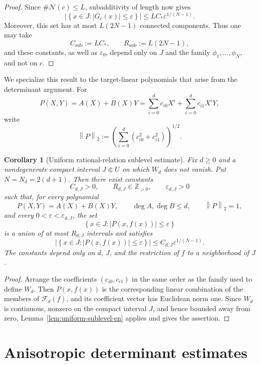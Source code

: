 \documentclass[11pt]{amsart}
\numberwithin{equation}{section}
\newtheorem{corollary}[corollary]{Corollary}
\theoremstyle{definition}
\theoremstyle{remark}
\newcommand{\Z}{\mathbb Z}
\newcommand{\norm}[1]{\left\lVert #1\right\rVert}
\newcommand{\abs}[1]{\left\lvert #1\right\rvert}
\newcommand{\set}[1]{\left\{#1\right\}}
\newcommand{\eps}{\varepsilon}
\begin{document}
\begin{proof}
Since $\#\mathcal N(c)\leq L$, subadditivity of length now gives
\[
\left|\set{x\in J:\abs{G_c(x)}\leq\eps}\right|
\leq
LC_*\eps^{1/(N-1)}.
\]
Moreover, this set has at most $L(2N-1)$ connected components.
Thus one may take
\[
C_{\mathrm{sub}}:=LC_*,
\qquad
R_{\mathrm{sub}}:=L(2N-1),
\]
and these constants, as well as $\eps_0$, depend only on $J$ and the
family $\phi_1,\ldots,\phi_N$, and not on $c$.
\end{proof}

We specialize this result to the target-linear polynomials that arise
from the determinant argument. For
\[
P(X,Y)=A(X)+B(X)Y
=\sum_{i=0}^d c_{i0}X^i+\sum_{i=0}^d c_{i1}X^iY,
\]
write
\[
\norm{P}_2
:=
\left(\sum_{i=0}^d(c_{i0}^2+c_{i1}^2)\right)^{1/2}.
\]

\begin{corollary}[Uniform rational-relation sublevel estimate]
\label{cor:polynomial-sublevel-en}
Fix $d\geq0$ and a nondegenerate compact interval $J\Subset U$ on which $W_d$ does
not vanish. Put $N=N_d=2(d+1)$. Then there exist constants
\[
C_{d,J}>0,
\qquad
R_{d,J}\in\Z_{>0},
\qquad
\eps_{d,J}>0
\]
such that, for every polynomial
\[
P(X,Y)=A(X)+B(X)Y,
\qquad
\deg A,\deg B\leq d,
\qquad
\norm{P}_2=1,
\]
and every $0<\eps<\eps_{d,J}$, the set
\[
\set{x\in J:\abs{P(x,f(x))}\leq\eps}
\]
is a union of at most $R_{d,J}$ intervals and satisfies
\begin{equation}\label{eq:poly-sublevel-en}
\left|\set{x\in J:\abs{P(x,f(x))}\leq\eps}\right|
\leq C_{d,J}\eps^{1/(N-1)}.
\end{equation}
The constants depend only on $d$, $J$, and the restriction of $f$ to a
neighborhood of $J$.
\end{corollary}

\begin{proof}
Arrange the coefficients $(c_{i0},c_{i1})$ in the same order as the
family used to define $W_d$. Then $P(x,f(x))$ is the corresponding
linear combination of the members of $\mathcal F_d(f)$, and its
coefficient vector has Euclidean norm one. Since $W_d$ is continuous,
nonzero on the compact interval $J$, and hence bounded away from zero,
Lemma~\ref{lem:uniform-sublevel-en} applies and gives the assertion.
\end{proof}

\section{Anisotropic determinant estimates}
\label{sec:determinant}
\end{document}

